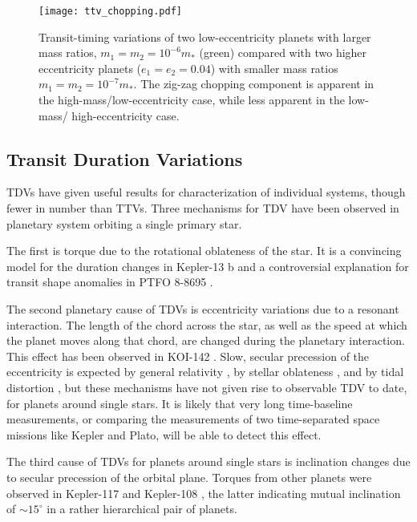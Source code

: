 \documentclass[graybox,natbib,nosecnum]{svmult}
\begin{document}
\begin{figure}
\centerline{
\texttt{[image: ttv\_chopping.pdf]}}
%
\caption{Transit-timing variations of two low-eccentricity planets with larger
mass ratios, $m_1 = m_2 = 10^{-6} m_*$ (green) compared with two higher eccentricity planets ($e_1=e_2=0.04$)
with smaller mass ratios $m_1 = m_2 = 10^{-7} m_*$.  The zig-zag chopping component
is apparent in the high-mass/low-eccentricity case, while less apparent in the low-mass/
high-eccentricity case.}
\label{ttv_chopping}       %
\end{figure}



\subsection{Transit Duration Variations}

TDVs have given useful results for characterization of individual systems, though fewer in number than TTVs.  Three mechanisms for TDV have been observed in planetary system orbiting a single primary star.  

The first is torque due to the rotational oblateness of the star.  It is a convincing model for the duration changes in Kepler-13 b \citep[KOI 13.01][]{Szab2012} and a controversial explanation for transit shape anomalies in PTFO 8-8695 \citep{2013ApJ...774...53B}.  

The second planetary cause of TDVs is eccentricity variations due to a resonant interaction.  The length of the chord across the star, as well as the speed at which the planet moves along that chord, are changed during the planetary interaction.  This effect has been observed in KOI-142 \citep{2013ApJ...777....3N}.  Slow, secular precession of the eccentricity is expected by general relativity \citep{2008MNRAS.389..191P}, by stellar oblateness \citep{2007MNRAS.377.1511H}, and by tidal distortion \citep{2009ApJ...698.1778R}, but these mechanisms have not given rise to observable TDV to date, for planets around single stars.  It is likely that very long time-baseline measurements, or comparing the measurements of two time-separated space missions like Kepler and Plato, will be able to detect this effect.

The third cause of TDVs for planets around single stars is inclination changes due to secular precession of the orbital plane.  Torques from other planets were observed in Kepler-117 \citep{2015MNRAS.453.2644A} and Kepler-108 \citep{1538-3881-153-1-45}, the latter indicating mutual inclination of $\sim 15^\circ$ in a rather hierarchical pair of planets.  
\end{document}

